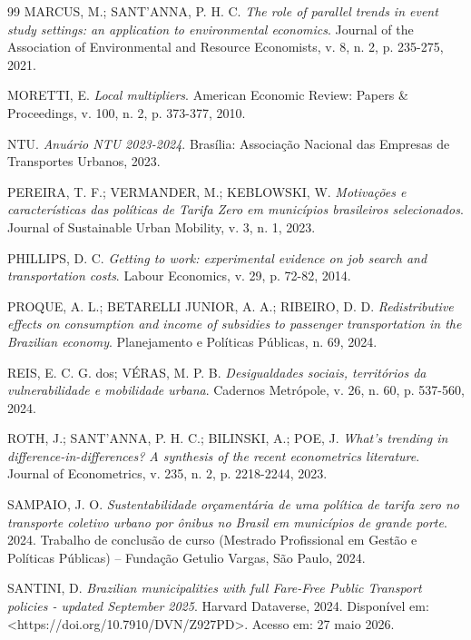\documentclass[12pt, a4paper]{article}
\begin{document}
\begin{thebibliography}{99}
MARCUS, M.; SANT’ANNA, P. H. C. \textit{The role of parallel trends in event study settings: an application to environmental economics}. Journal of the Association of Environmental and Resource Economists, v. 8, n. 2, p. 235-275, 2021.

MORETTI, E. \textit{Local multipliers}. American Economic Review: Papers \& Proceedings, v. 100, n. 2, p. 373-377, 2010.

NTU. \textit{Anuário NTU 2023-2024}. Brasília: Associação Nacional das Empresas de Transportes Urbanos, 2023.

PEREIRA, T. F.; VERMANDER, M.; KEBLOWSKI, W. \textit{Motivações e características das políticas de Tarifa Zero em municípios brasileiros selecionados}. Journal of Sustainable Urban Mobility, v. 3, n. 1, 2023.

PHILLIPS, D. C. \textit{Getting to work: experimental evidence on job search and transportation costs}. Labour Economics, v. 29, p. 72-82, 2014.

PROQUE, A. L.; BETARELLI JUNIOR, A. A.; RIBEIRO, D. D. \textit{Redistributive effects on consumption and income of subsidies to passenger transportation in the Brazilian economy}. Planejamento e Políticas Públicas, n. 69, 2024.

REIS, E. C. G. dos; VÉRAS, M. P. B. \textit{Desigualdades sociais, territórios da vulnerabilidade e mobilidade urbana}. Cadernos Metrópole, v. 26, n. 60, p. 537-560, 2024.

ROTH, J.; SANT’ANNA, P. H. C.; BILINSKI, A.; POE, J. \textit{What’s trending in difference-in-differences? A synthesis of the recent econometrics literature}. Journal of Econometrics, v. 235, n. 2, p. 2218-2244, 2023.

SAMPAIO, J. O. \textit{Sustentabilidade orçamentária de uma política de tarifa zero no transporte coletivo urbano por ônibus no Brasil em municípios de grande porte}. 2024. Trabalho de conclusão de curso (Mestrado Profissional em Gestão e Políticas Públicas) – Fundação Getulio Vargas, São Paulo, 2024.

SANTINI, D. \textit{Brazilian municipalities with full Fare-Free Public Transport policies - updated September 2025}. Harvard Dataverse, 2024. Disponível em: <https://doi.org/10.7910/DVN/Z927PD>. Acesso em: 27 maio 2026.


\end{thebibliography}
\end{document}
